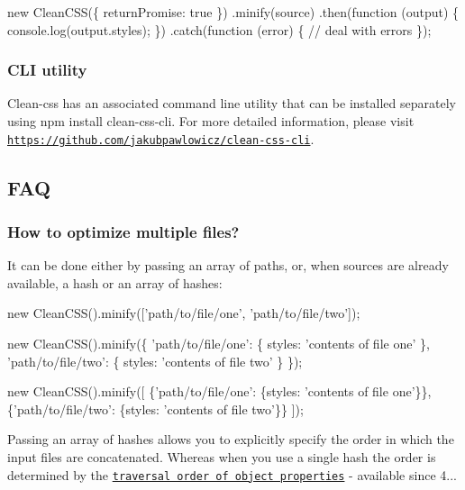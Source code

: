 \begin{DoxyCode}
new CleanCSS(\{ returnPromise: true \})
  .minify(source)
  .then(function (output) \{ console.log(output.styles); \})
  .catch(function (error) \{ // deal with errors \});
\end{DoxyCode}


\subsubsection*{C\+LI utility}

Clean-\/css has an associated command line utility that can be installed separately using {\ttfamily npm install clean-\/css-\/cli}. For more detailed information, please visit \href{https://github.com/jakubpawlowicz/clean-css-cli}{\tt https\+://github.\+com/jakubpawlowicz/clean-\/css-\/cli}.

\subsection*{F\+AQ}

\subsubsection*{How to optimize multiple files?}

It can be done either by passing an array of paths, or, when sources are already available, a hash or an array of hashes\+:


\begin{DoxyCode}
new CleanCSS().minify(['path/to/file/one', 'path/to/file/two']);
\end{DoxyCode}



\begin{DoxyCode}
new CleanCSS().minify(\{
  'path/to/file/one': \{
    styles: 'contents of file one'
  \},
  'path/to/file/two': \{
    styles: 'contents of file two'
  \}
\});
\end{DoxyCode}



\begin{DoxyCode}
new CleanCSS().minify([
  \{'path/to/file/one': \{styles: 'contents of file one'\}\},
  \{'path/to/file/two': \{styles: 'contents of file two'\}\}
]);
\end{DoxyCode}


Passing an array of hashes allows you to explicitly specify the order in which the input files are concatenated. Whereas when you use a single hash the order is determined by the \href{http://2ality.com/2015/10/property-traversal-order-es6.html}{\tt traversal order of object properties} -\/ available since 4...

